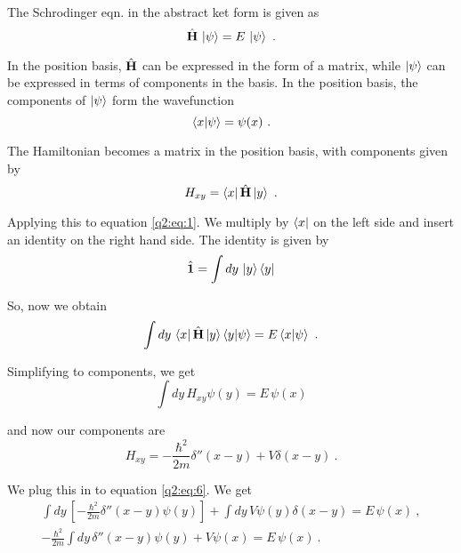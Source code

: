 
The Schrodinger eqn. in the abstract ket form is given as 
    \begin{equation} \label{q2:eq:1}
        \hat{\textbf{H}} \, \ket{\psi} = E\, \ket{\psi}~.
    \end{equation}
    
In the position basis, $\hat{\textbf{H}}$ can be expressed in the form of a matrix, while $\ket{\psi}$ can be expressed in terms of components in the basis.
In the position basis, the components of $\ket{\psi}$ form the wavefunction
    \begin{equation}
        \braket{x}{\psi} = \psi(x)~.
    \end{equation}

The Hamiltonian becomes a matrix in the position basis, with components given by 
    \begin{equation}
        H_{xy} = \bra{x}\hat{\textbf{H}}\ket{y}~.
    \end{equation}

Applying this to equation \ref{q2:eq:1}. We multiply by $\bra{x}$ on the left side and insert an identity on the right hand side.
The identity is given by 
    \begin{equation}
        \hat{\textbf{1}} = \int dy\, \ket{y}\bra{y}
    \end{equation}

So, now we obtain 
    \begin{equation}
        \int dy\, \bra{x}\hat{\textbf{H}}\ket{y}\braket{y}{\psi} = E \braket{x}{\psi}~.
    \end{equation}

Simplifying to components, we get 
    \begin{equation} \label{q2:eq:6}
        \int dy \, H_{xy} \psi(y) = E \, \psi(x)
    \end{equation}

and now our components are 
    \begin{equation}
        H_{xy} = -\frac{\hbar^2}{2m}\delta''(x-y) + V\delta(x-y)~.
    \end{equation}

We plug this in to equation \ref{q2:eq:6}. We get  
    \begin{gather}
        \int dy \, [-\frac{\hbar^2}{2m}\delta''(x-y) \psi(y)] + \int dy \, V\psi(y)\delta(x-y) = E \, \psi(x)~,
        \\- \frac{\hbar^2}{2m} \int dy \, \delta''(x-y) \psi(y) + V \psi(x) = E\,  \psi(x)~.        
    \end{gather}

